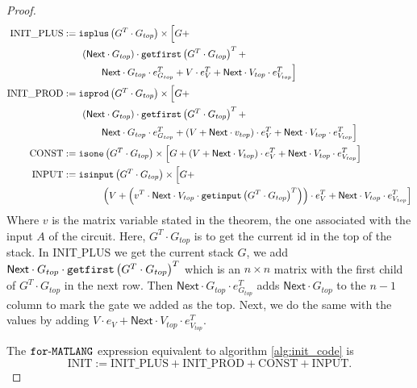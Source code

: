 \begin{proof}
    \begin{align*}
        \text{INIT{\_}PLUS} &:= \texttt{isplus}\left( G^T\cdot G_{top} \right)\times \Big[ G + \\
        &\hspace{2em}(\mathsf{Next}\cdot G_{top}) \cdot \texttt{getfirst}\left(G^T\cdot G_{top} \right)^T  + \\
        &\hspace{4em}\mathsf{Next}\cdot G_{top}\cdot e_{G_{top}}^T +V\cdot e_{V}^T + \mathsf{Next}\cdot V_{top}\cdot e_{V_{top}}^T \Big] \\
        \text{INIT{\_}PROD} &:= \texttt{isprod}\left(G^T\cdot G_{top} \right)\times \Big[ G + \\
        &\hspace{2em}(\mathsf{Next}\cdot G_{top}) \cdot \texttt{getfirst}\left(G^T\cdot G_{top} \right)^T + \\
        &\hspace{4em}\mathsf{Next}\cdot G_{top}\cdot e_{G_{top}}^T +(V + \mathsf{Next}\cdot v_{top})\cdot e_{V}^T + \mathsf{Next}\cdot V_{top}\cdot e_{V_{top}}^T \Big] \\
        \text{CONST} &:= \texttt{isone}\left(G^T\cdot G_{top} \right)\times \left[ G + (V + \mathsf{Next}\cdot V_{top})\cdot e_{V}^T + \mathsf{Next}\cdot V_{top}\cdot e_{V_{top}}^T \right] \\
        \text{INPUT} &:= \texttt{isinput}\left(G^T\cdot G_{top} \right)\times \Big[ G + \\
        &\hspace{4em}\left(V + \left( v^T \cdot \mathsf{Next}\cdot V_{top} \cdot \texttt{getinput}\left(G^T\cdot G_{top} \right)^T \right)\right)\cdot e_{V}^T + \mathsf{Next}\cdot V_{top}\cdot e_{V_{top}}^T \Big]
    \end{align*} 
    Where $v$ is the matrix variable stated in the theorem, the one associated with the input $A$ of the circuit.
    Here, $G^T\cdot G_{top}$ is to get the current id in the top of the stack. In INIT${\_}$PLUS we get the current stack $G$, we add $\mathsf{Next}\cdot G_{top} \cdot \texttt{getfirst}\left(G^T\cdot G_{top} \right)^T$ which is an $n\times n$ matrix with the first child of $G^T\cdot G_{top}$ in the next row. Then $\mathsf{Next}\cdot G_{top}\cdot e_{G_{top}}^T$ adds $\mathsf{Next}\cdot G_{top}$ to the $n-1$ column to mark the gate we added as the top. Next, we do the same with the values by adding $V\cdot e_{V} + \mathsf{Next}\cdot V_{top}\cdot e_{V_{top}}^T$.

    The $\texttt{for}\text{-}\texttt{MATLANG}$ expression equivalent to algorithm \ref{alg:init_code} is $$\text{INIT}:=\text{INIT{\_}PLUS}+\text{INIT{\_}PROD}+\text{CONST}+\text{INPUT}.$$


\end{proof}
